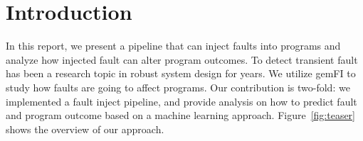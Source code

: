 \section{Introduction}
In this report, we present a pipeline that can inject faults into programs and analyze how injected fault can alter program outcomes. To detect transient fault has been a research topic in robust system design for years. We utilize gemFI to study how faults are going to affect programs. Our contribution is two-fold: we implemented a fault inject pipeline, and provide analysis on how to predict fault and program outcome based on a machine learning approach. Figure~\ref{fig:teaser} shows the overview of our approach.
